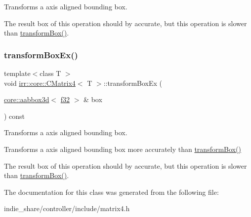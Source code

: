 Transforms a axis aligned bounding box. 

The result box of this operation should by accurate, but this operation is slower than \hyperlink{classirr_1_1core_1_1CMatrix4_a0e6a0a3b1b20aac7313806fdb1a01316}{transform\+Box()}. \mbox{\label{classirr_1_1core_1_1CMatrix4_a2fcdfa14ef16240470e2b46d19a5cb43}} 
\subsubsection{\texorpdfstring{transform\+Box\+Ex()}{transformBoxEx()}\hspace{0.1cm}{\footnotesize\ttfamily [2/2]}}
{\footnotesize\ttfamily template$<$class T $>$ \\
void \hyperlink{classirr_1_1core_1_1CMatrix4}{irr\+::core\+::\+C\+Matrix4}$<$ T $>$\+::transform\+Box\+Ex (\begin{DoxyParamCaption}\item[{\hyperlink{classirr_1_1core_1_1aabbox3d}{core\+::aabbox3d}$<$ \hyperlink{namespaceirr_a0277be98d67dc26ff93b1a6a1d086b07}{f32} $>$ \&}]{box }\end{DoxyParamCaption}) const\hspace{0.3cm}{\ttfamily [inline]}}



Transforms a axis aligned bounding box. 

Transforms a axis aligned bounding box more accurately than \hyperlink{classirr_1_1core_1_1CMatrix4_a0e6a0a3b1b20aac7313806fdb1a01316}{transform\+Box()}

The result box of this operation should by accurate, but this operation is slower than \hyperlink{classirr_1_1core_1_1CMatrix4_a0e6a0a3b1b20aac7313806fdb1a01316}{transform\+Box()}. 

The documentation for this class was generated from the following file\+:\begin{DoxyCompactItemize}
\item 
indie\+\_\+share/controller/include/matrix4.\+h\end{DoxyCompactItemize}
